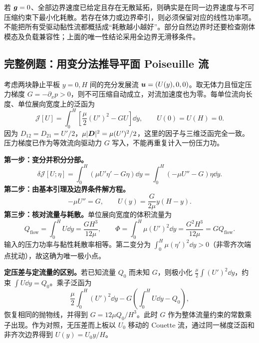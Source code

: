 若 $\bm{g}=0$、全部边界速度已给定且存在无散延拓，则确实是在同一边界速度与不可压缩约束下最小化耗散。若存在体力或边界牵引，则必须保留对应的线性功率项。不能把所有受驱动黏性流都概括成“耗散越小越好”。部分自然边界时还要检查刚体模态及负载兼容性；上面的唯一性结论采用全边界无滑移条件。

\subsection{完整例题：用变分法推导平面 Poiseuille 流}

考虑两块静止平板 $y=0,H$ 间的充分发展流 $\bm{u}=(U(y),0,0)$。取无体力且恒定压力梯度 $G=-\partial_xp>0$，则不可压缩自动成立，对流加速度也为零。每单位流向长度、单位展向宽度上的泛函为
\begin{equation}
 \mathcal J[U]=\int_0^H\left[\frac\mu2(U')^2-GU\right]\dd y,
 \qquad U(0)=U(H)=0.\label{eq:poiseuille-functional}
\end{equation}
因为 $D_{12}=D_{21}=U'/2$，$\mu|\bm{D}|^2=\mu(U')^2/2$，这里的因子与三维泛函完全一致。压力梯度已作为等效流向驱动力 $G$ 写入，不能再重复计入一份压力功。

\textbf{第一步：变分并积分分部。}
\begin{equation}
 \delta\mathcal J[U;\eta]=\int_0^H(\mu U'\eta'-G\eta)\dd y
 =\int_0^H(-\mu U''-G)\eta\dd y.
\end{equation}
\textbf{第二步：由基本引理及边界条件解方程。}
\begin{equation}
 -\mu U''=G,\qquad
 \boxed{U(y)=\frac G{2\mu}y(H-y).}\label{eq:poiseuille-variation-solution}
\end{equation}
\textbf{第三步：核对流量与耗散。}单位展向宽度的体积流量为
\begin{equation}
 Q_{\mathrm{flow}}=\int_0^H U\dd y=\frac{GH^3}{12\mu},\qquad
 \Phi=\int_0^H\mu(U')^2\dd y
 =\frac{G^2H^3}{12\mu}=GQ_{\mathrm{flow}}.
\end{equation}
输入的压力功率与黏性耗散率相等。第二变分为 $\int_0^H\mu(\eta')^2\dd y>0$（非零齐次端点扰动），故这确为唯一极小点。

\textbf{定压差与定流量的区别。}若已知流量 $Q_0$ 而未知 $G$，则极小化 $\frac\mu2\int(U')^2\dd y$，约束 $\int U\dd y=Q_0$。乘子泛函为
\begin{equation}
 \frac\mu2\int_0^H(U')^2\dd y
 -G\left(\int_0^H U\dd y-Q_0\right),
\end{equation}
恢复相同的抛物线，并得到 $G=12\mu Q_0/H^3$。此时 $G$ 作为整体流量约束的常数乘子出现。作为对照，无压差而上板以 $U_0$ 移动的 Couette 流，通过同一梯度泛函和非齐次边界得到 $U(y)=U_0y/H$。

